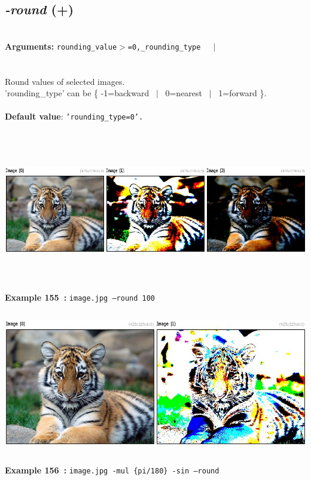 \documentclass[a4paper,11pt,twoside]{book}
\begin{document}
\subsection{\emph{-round} (+)}\vspace*{-0.5em}
~\\\textbf{Arguments: } 
{\small \texttt{rounding\_value$>$=0,\_rounding\_type}}~~~$|$\\
\\~\\
Round values of selected images.
~\\'rounding\_type' can be \{ -1=backward ~$|$~ 0=nearest ~$|$~ 1=forward \}.
~\\~\\\textbf{Default value}: {\small \texttt{'rounding\_type=0'.}}
\begin{center}\includegraphics[keepaspectratio=true,height=7cm,width=\textwidth]{img/gmic_def155.jpg}\\
{\footnotesize \textbf{Example 155~:} \texttt{image.jpg --round 100}}
\\\includegraphics[keepaspectratio=true,height=7cm,width=\textwidth]{img/gmic_def156.jpg}\\
{\footnotesize \textbf{Example 156~:} \texttt{image.jpg -mul \{pi/180\} -sin --round}}
\end{center}
\end{document}
